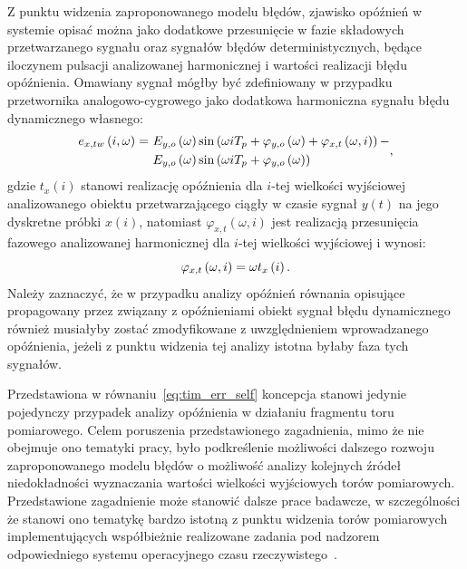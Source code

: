 Z punktu widzenia zaproponowanego modelu błędów, zjawisko opóźnień w systemie opisać można jako dodatkowe przesunięcie w fazie składowych przetwarzanego sygnału oraz sygnałów błędów deterministycznych, będące iloczynem pulsacji analizowanej harmonicznej i wartości realizacji błędu opóźnienia. Omawiany sygnał mógłby być zdefiniowany w przypadku przetwornika analogowo-cygrowego jako dodatkowa harmoniczna sygnału błędu dynamicznego własnego:
\begin{equation}
\begin{split}
e_{x,tw} \left(i,\omega\right) =~
& E_{y,o} \left(\omega\right) \sin \left( \omega i T_{p} + \varphi_{y,o} \left(\omega\right) + \varphi_{x,t} \left(\omega, i\right) \right) - \\
& E_{y,o} \left(\omega\right) \sin \left( \omega i T_{p} + \varphi_{y,o} \left(\omega\right) \right)
\end{split}
\label{eq:tim_err_self},
\end{equation}
gdzie $t_{x}(i)$ stanowi realizację opóźnienia dla $i$-tej wielkości wyjściowej analizowanego obiektu przetwarzającego ciągły w czasie sygnał $y(t)$ na jego dyskretne próbki $x(i)$, natomiast $\varphi_{x,t}(\omega, i)$ jest realizacją przesunięcia fazowego analizowanej harmonicznej dla $i$-tej wielkości wyjściowej i wynosi:
\begin{equation}
\varphi_{x,t} \left(\omega, i\right) = \omega t_{x} \left(i\right) \label{eq:tim_err_phi}.
\end{equation}
Należy zaznaczyć, że w przypadku analizy opóźnień równania opisujące propagowany przez związany z opóźnieniami obiekt sygnał błędu dynamicznego również musiałyby zostać zmodyfikowane z uwzględnieniem wprowadzanego opóźnienia, jeżeli z punktu widzenia tej analizy istotna byłaby faza tych sygnałów.

Przedstawiona w równaniu~\eqref{eq:tim_err_self} koncepcja stanowi jedynie pojedynczy przypadek analizy opóźnienia w działaniu fragmentu toru pomiarowego. Celem poruszenia przedstawionego zagadnienia, mimo że nie obejmuje ono tematyki pracy, było podkreślenie możliwości dalszego rozwoju zaproponowanego modelu błędów o możliwość analizy kolejnych źródeł niedokładności wyznaczania wartości wielkości wyjściowych torów pomiarowych. Przedstawione zagadnienie może stanowić dalsze prace badawcze, w szczególności że stanowi ono tematykę bardzo istotną z punktu widzenia torów pomiarowych implementujących współbieżnie realizowane zadania pod nadzorem odpowiedniego systemu operacyjnego czasu rzeczywistego~\cite{bandyszak_rtos, laplante_rtos}.

